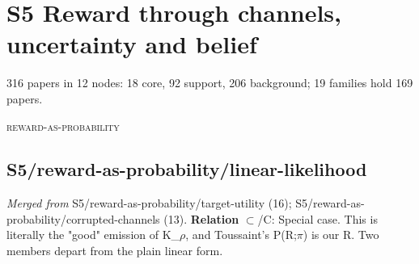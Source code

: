 \documentclass[10pt]{article}
\begin{document}
\section{S5 Reward through channels, uncertainty and belief}
316 papers in 12 nodes: 18 core, 92 support, 206 background; 19 families hold 169 papers.

\medskip\textsc{reward-as-probability}

\subsection{S5/reward-as-probability/linear-likelihood}\label{node:S5-S5-reward-as-probability-linear-likelihood}
\textit{Merged from} S5/reward-as-probability/target-utility (16); S5/reward-as-probability/corrupted-channels (13). \textbf{Relation} $\subset$/\textsf{C}: Special case. This is literally the "good" emission of K\_\ensuremath{\rho}, and Toussaint's P(R;\ensuremath{\pi}) is our R. Two members depart from the plain linear form.
\end{document}
